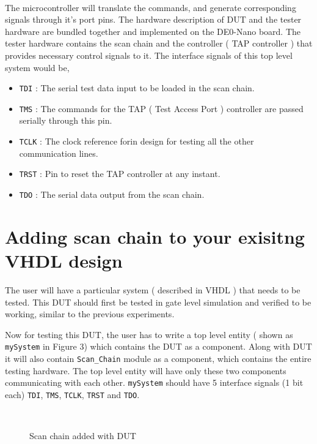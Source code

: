\documentclass[a4paper,11pt]{article}
\begin{document}
\paragraph*{}

The microcontroller will translate the commands, and generate corresponding signals through it's port pins. The hardware description of DUT and the tester hardware are bundled together and implemented on the DE0-Nano board. The tester hardware contains the scan chain and the controller ( TAP controller ) that provides necessary control signals to it. The interface signals of this top level system would be,

\begin{itemize}
\item \texttt{TDI} : The serial test data input to be loaded in the scan chain.
\item \texttt{TMS} : The commands for the TAP ( Test Access Port ) controller are passed serially through this pin.
\item \texttt{TCLK} : The clock reference forin design for testing all the other communication lines.
\item \texttt{TRST} : Pin to reset the TAP controller at any instant.
\item \texttt{TDO} : The serial data output from the scan chain.
\end{itemize}


\section{Adding scan chain to your exisitng VHDL design}

The user will have a particular system ( described in VHDL ) that needs to be tested. This DUT should first be tested in gate level simulation and verified to be working, similar to the previous experiments.

Now for testing this DUT, the user has to write a top level entity ( shown as \texttt{mySystem} in Figure 3) which contains the DUT as a component. Along with DUT it will also contain \texttt{Scan\_Chain} module as a component, which contains the entire testing hardware. The top level entity will have only these two components communicating with each other.
\texttt{mySystem} should have 5 interface signals (1 bit each) \texttt{TDI}, \texttt{TMS}, \texttt{TCLK}, \texttt{TRST} and \texttt{TDO}.
\begin{figure}[h!]
\centering
\\
\caption{Scan chain added with DUT}
\end{figure}
\end{document}

